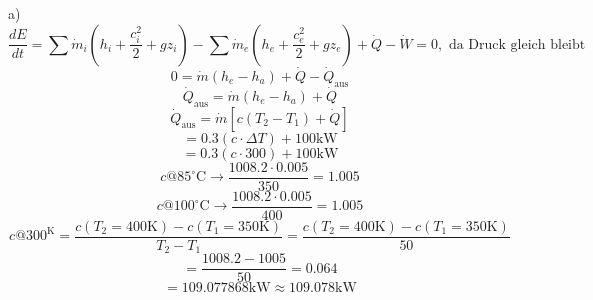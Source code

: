 a) \\
\[
\frac{dE}{dt} = \sum \dot{m}_i (h_i + \frac{c_i^2}{2} + gz_i) - \sum \dot{m}_e (h_e + \frac{c_e^2}{2} + gz_e) + \dot{Q} - \dot{W} = 0, \text{ da Druck gleich bleibt}
\]
\[
0 = \dot{m} (h_e - h_a) + \dot{Q} - \dot{Q}_{\text{aus}}
\]
\[
\dot{Q}_{\text{aus}} = \dot{m} (h_e - h_a) + \dot{Q}
\]
\[
\dot{Q}_{\text{aus}} = \dot{m} [c (T_2 - T_1) + \dot{Q}]
\]
\[
= 0.3 (c \cdot \Delta T) + 100 \text{kW}
\]
\[
= 0.3 (c \cdot 300) + 100 \text{kW}
\]
\[
c @ 85^\circ \text{C} \rightarrow \frac{1008.2 \cdot 0.005}{350} = 1.005
\]
\[
c @ 100^\circ \text{C} \rightarrow \frac{1008.2 \cdot 0.005}{400} = 1.005
\]
\[
c @ 300^\text{K} = \frac{c (T_2 = 400 \text{K}) - c (T_1 = 350 \text{K})}{T_2 - T_1} = \frac{c (T_2 = 400 \text{K}) - c (T_1 = 350 \text{K})}{50}
\]
\[
= \frac{1008.2 - 1005}{50} = 0.064
\]
\[
= 109.077868 \text{kW} \approx 109.078 \text{kW}
\]